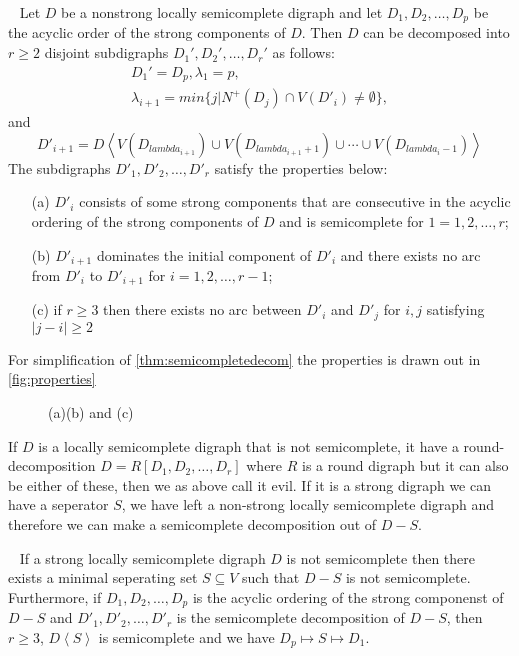 \begin{thm}~\cite{bangJGT85,banggutin,bangJCT102}
    Let $D$ be a nonstrong locally semicomplete digraph and let $D_1,D_2,\dots,D_p$ be the acyclic order of the strong components of $D$. Then $D$ can be decomposed into $r\geq 2$ disjoint subdigraphs $D_1',D_2',\dots, D_r'$ as follows:
    \begin{align*}
        D_1'=D_p, \lambda_1=p,\\
        \lambda_{i+1}=min\lbrace j|N^+(D_j)\cap V(D'_i)\neq \emptyset\rbrace,
    \end{align*}
    and
    \begin{equation*}
        D'_{i+1}=D\left<V(D_{lambda_{i+1}})\cup V(D_{lambda_{i+1}+1})\cup \cdots \cup V(D_{lambda_{i}-1})\right>
    \end{equation*}
    The subdigraphs $D'_1,D'_2,\dots,D'_r$ satisfy the properties below:
    \begin{itemize}
        \item[(a)] $D'_i$ consists of some strong components that are consecutive in the acyclic ordering of the strong components of $D$ and is semicomplete for $1=1,2,\dots,r$;
        \item[(b)] $D'_{i+1}$ dominates the initial component of $D'_i$ and there exists no arc from $D'_i$ to $D'_{i+1}$ for $i=1,2,\dots,r-1$;
        \item[(c)] if $r\geq 3$ then there exists no arc between $D'_i$ and $D'_j$ for $i,j$ satisfying $|j-i|\geq 2$  
    \end{itemize}
    \label{thm:semicompletedecom}
\end{thm}
For simplification of \autoref{thm:semicompletedecom} the properties is drawn out in \autoref{fig:properties}
\begin{figure}
    \caption{(a)(b) and (c)}
    \label{fig:properties}
\end{figure}
If $D$ is a locally semicomplete digraph that is not semicomplete, it have a round-decomposition $D=R[D_1,D_2,\dots ,D_r]$ where $R$ is a round digraph but it can also be either of these, then we as above call it evil. If it is a strong digraph we can have a seperator $S$, we have left a non-strong locally semicomplete digraph and therefore we can make a semicomplete decomposition out of $D-S$.
\begin{thm}~\cite{banggutin}
    If a strong locally semicomplete digraph $D$ is not semicomplete then there exists a minimal seperating set $S\subseteq V$ such that $D-S$ is not semicomplete. Furthermore, if $D_1,D_2,\dots , D_p$ is the acyclic ordering of the strong componenst of $D-S$ and $D'_1,D'_2,\dots ,D'_r$ is the semicomplete decomposition of $D-S$, then $r\geq 3$, $D\left<S\right>$ is semicomplete and we have $D_p\mapsto S\mapsto D_1$.  
\end{thm}
